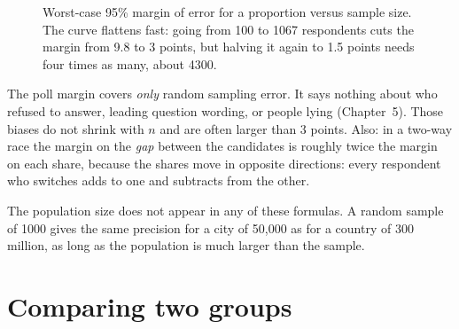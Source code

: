 \begin{figure}[H]
\centering
{}
\caption{Worst-case 95\% margin of error for a proportion versus sample size.
The curve flattens fast: going from 100 to 1067 respondents cuts the margin
from 9.8 to 3 points, but halving it again to 1.5 points needs four times
as many, about 4300.}
\label{fig:ci-moe-curve}
\end{figure}

\begin{trapbox}
The poll margin covers \emph{only} random sampling error. It says nothing about
who refused to answer, leading question wording, or people lying (Chapter~5).
Those biases do not shrink with $n$ and are often larger than 3 points.
Also: in a two-way race the margin on the \emph{gap} between the candidates is
roughly twice the margin on each share, because the shares move in opposite
directions: every respondent who switches adds to one and subtracts from the
other.
\end{trapbox}

The population size does not appear in any of these formulas. A random sample
of 1000 gives the same precision for a city of 50{,}000 as for a country of
300 million, as long as the population is much larger than the sample.

\section{Comparing two groups}
\label{sec:ci-two-sample}


